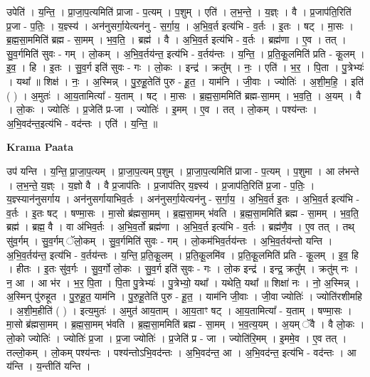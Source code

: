 \documentclass[17pt]{extarticle}
\begin{document}
उपेति॑ । य॒न्ति॒ । प्रा॒जा॒प॒त्यमिति॑ प्राजा - प॒त्यम् । प॒शुम् । एति॑ । ल॒भ॒न्ते॒ । य॒ज्ञ्ः । वै । प्र॒जाप॑ति॒रिति॑ प्र॒जा - प॒तिः॒ । य॒ज्ञ्स्य॑ । अन॑नुसर्गा॒येत्यन॑नु - स॒र्गा॒य॒ । अ॒भि॒व॒र्त इत्य॑भि - व॒र्तः । इ॒तः । षट् । मा॒सः । ब्र॒ह्म॒सा॒ममिति॑ ब्रह्म - सा॒मम् । भ॒व॒ति॒ । ब्रह्म॑ । वै । अ॒भि॒व॒र्त इत्य॑भि - व॒र्तः । ब्रह्म॑णा । ए॒व । तत् । सु॒व॒र्गमिति॑ सुवः - गम् । लो॒कम् । अ॒भि॒व॒र्तय॑न्त॒ इत्य॑भि - व॒र्तय॑न्तः । य॒न्ति॒ । प्र॒ति॒कू॒लमिति॑ प्रति - कू॒लम् । इ॒व॒ । हि । इ॒तः । सु॒व॒र्ग इति॑ सुवः - गः । लो॒कः । इन्द्र॑ । क्रतु᳚म् । नः॒ । एति॑ । भ॒र॒ । पि॒ता । पु॒त्रेभ्यः॑ । यथा᳚ ॥ शिक्ष॑ । नः॒ । अ॒स्मिन्न् । पु॒रु॒हू॒तेति॑ पुरु - हू॒त॒ । याम॑नि । जी॒वाः । ज्योतिः॑ । अ॒शी॒म॒हि॒ । इति॑ ( ) । अ॒मुतः॑ । आ॒य॒तामित्या᳚ - य॒ताम् । षट् । मा॒सः । ब्र॒ह्म॒सा॒ममिति॑ ब्रह्म-सा॒मम् । भ॒व॒ति॒ । अ॒यम् । वै । लो॒कः । ज्योतिः॑ । प्र॒जेति॑ प्र-जा । ज्योतिः॑ । इ॒मम् । ए॒व । तत् । लो॒कम् । पश्य॑न्तः । अ॒भि॒वद॑न्त॒इत्य॑भि - वद॑न्तः । एति॑ । य॒न्ति॒ ॥  \newline


\textbf{Krama Paata} \newline

उप॑ यन्ति । य॒न्ति॒ प्रा॒जा॒प॒त्यम् । प्रा॒जा॒प॒त्यम् प॒शुम् । प्रा॒जा॒प॒त्यमिति॑ प्राजा - प॒त्यम् । प॒शुमा । आ ल॑भन्ते । ल॒भ॒न्ते॒ य॒ज्ञ्ः । य॒ज्ञो वै । वै प्र॒जाप॑तिः । प्र॒जाप॑तिर् य॒ज्ञ्स्य॑ । प्र॒जाप॑ति॒रिति॑ प्र॒जा - प॒तिः॒ । य॒ज्ञ्स्यान॑नुसर्गाय । अन॑नुसर्गायाभिव॒र्तः । अन॑नुसर्गा॒येत्यन॑नु - स॒र्गा॒य॒ । अ॒भि॒व॒र्त इ॒तः । अ॒भि॒व॒र्त इत्य॑भि - व॒र्तः । इ॒तः षट् । षण्मा॒सः । मा॒सो ब्र॑ह्मसा॒मम् । ब्र॒ह्म॒सा॒मम् भ॑वति । ब्र॒ह्म॒सा॒ममिति॑ ब्रह्म - सा॒मम् । भ॒व॒ति॒ ब्रह्म॑ । ब्रह्म॒ वै । वा अ॑भिव॒र्तः । अ॒भि॒व॒र्तो ब्रह्म॑णा । अ॒भि॒व॒र्त इत्य॑भि - व॒र्तः । ब्रह्म॑णै॒व । ए॒व तत् । तथ् सु॑व॒र्गम् । सु॒व॒र्गम् ॅलो॒कम् । सु॒व॒र्गमिति॑ सुवः - गम् । लो॒कम॑भिव॒र्तय॑न्तः । अ॒भि॒व॒र्तय॑न्तो यन्ति । अ॒भि॒व॒र्तय॑न्त॒ इत्य॑भि - व॒र्तय॑न्तः । य॒न्ति॒ प्र॒ति॒कू॒लम् । प्र॒ति॒कू॒लमि॑व । प्र॒ति॒कू॒लमिति॑ प्रति - कू॒लम् । इ॒व॒ हि । हीतः । इ॒तः सु॑व॒र्गः । सु॒व॒र्गो लो॒कः । सु॒व॒र्ग इति॑ सुवः - गः । लो॒क इन्द्र॑ । इन्द्र॒ क्रतु᳚म् । क्रतु॑म् नः । न॒ आ । आ भ॑र । भ॒र॒ पि॒ता । पि॒ता पु॒त्रेभ्यः॑ । पु॒त्रेभ्यो॒ यथा᳚ । यथेति॒ यथा᳚ ॥ शिक्षा॑ नः । नो॒ अ॒स्मिन्न् । अ॒स्मिन् पु॑रुहूत । पु॒रु॒हू॒त॒ याम॑नि । पु॒रु॒हू॒तेति॑ पुरु - हू॒त॒ । याम॑नि जी॒वाः । जी॒वा ज्योतिः॑ । ज्योति॑रशीमहि । अ॒शी॒म॒हीति॑ ( ) । इत्य॒मुतः॑ । अ॒मुत॑ आय॒ताम् । आ॒य॒ताꣳ षट् । आ॒य॒तामित्या᳚ - य॒ताम् । षण्मा॒सः । मा॒सो ब्र॑ह्मसा॒मम् । ब्र॒ह्म॒सा॒मम् भ॑वति । ब्र॒ह्म॒सा॒ममिति॑ ब्रह्म - सा॒मम् । भ॒व॒त्य॒यम् । अ॒यम् ॅवै । वै लो॒कः । लो॒को ज्योतिः॑ । ज्योतिः॑ प्र॒जा । प्र॒जा ज्योतिः॑ । प्र॒जेति॑ प्र - जा । ज्योति॑रि॒मम् । इ॒ममे॒व । ए॒व तत् । तल्लो॒कम् । लो॒कम् पश्य॑न्तः । पश्य॑न्तोऽभि॒वद॑न्तः । अ॒भि॒वद॑न्त॒ आ । अ॒भि॒वद॑न्त॒ इत्य॑भि - वद॑न्तः । आ य॑न्ति । य॒न्तीति॑ यन्ति । \newline
\end{document}
